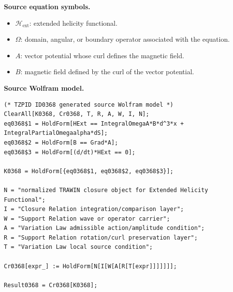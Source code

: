 \begin{minipage}[t]{0.49\linewidth}
\begingroup
\small
\raggedright
\textbf{Source equation symbols.}\par
\begin{itemize}[leftmargin=1.35em,itemsep=1pt,topsep=1pt,parsep=0pt]
    \item $\mathcal{H}_{\mathrm{ext}}$: extended helicity functional.
    \item $\Omega$: domain, angular, or boundary operator associated with the equation.
    \item $A$: vector potential whose curl defines the magnetic field.
    \item $B$: magnetic field defined by the curl of the vector potential.
\end{itemize}
\endgroup
\end{minipage}\hfill
\begin{minipage}[t]{0.47\linewidth}
\begingroup
\scriptsize
\raggedright
\textbf{Source Wolfram model.}\par
\begin{Verbatim}[fontsize=\tiny,breaklines=true,breakanywhere=true]
(* TZPID ID0368 generated source Wolfram model *)
ClearAll[K0368, Cr0368, T, R, A, W, I, N];
eq0368$1 = HoldForm[HExt == IntegralOmegaA*B*d^3*x + IntegralPartialOmegaalpha*dS];
eq0368$2 = HoldForm[B == Grad*A];
eq0368$3 = HoldForm[(d/dt)*HExt == 0];

K0368 = HoldForm[{eq0368$1, eq0368$2, eq0368$3}];

N = "normalized TRAWIN closure object for Extended Helicity Functional";
I = "Closure Relation integration/comparison layer";
W = "Support Relation wave or operator carrier";
A = "Variation Law admissible action/amplitude condition";
R = "Support Relation rotation/curl preservation layer";
T = "Variation Law local source condition";

Cr0368[expr_] := HoldForm[N[I[W[A[R[T[expr]]]]]]];

Result0368 = Cr0368[K0368];
\end{Verbatim}
\endgroup
\end{minipage}

